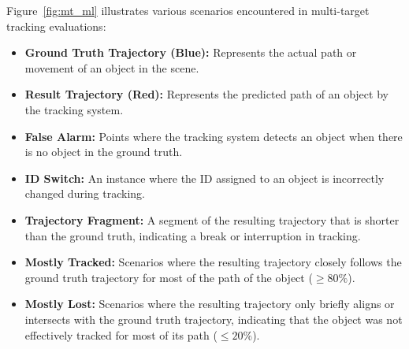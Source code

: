 Figure~\ref{fig:mt_ml} illustrates various scenarios encountered in multi-target tracking evaluations:

\begin{itemize}
    \item \textbf{Ground Truth Trajectory (Blue):} Represents the actual path or movement of an object in the scene.
    \item \textbf{Result Trajectory (Red):} Represents the predicted path of an object by the tracking system.
    \item \textbf{False Alarm:} Points where the tracking system detects an object when there is no object in the ground truth.
    \item \textbf{ID Switch:} An instance where the ID assigned to an object is incorrectly changed during tracking.
    \item \textbf{Trajectory Fragment:} A segment of the resulting trajectory that is shorter than the ground truth, indicating a break or interruption in tracking.
    \item \textbf{Mostly Tracked:} Scenarios where the resulting trajectory closely follows the ground truth trajectory for most of the path of the object (\(\geq 80\%\)).
    \item \textbf{Mostly Lost:} Scenarios where the resulting trajectory only briefly aligns or intersects with the ground truth trajectory, indicating that the object was not effectively tracked for most of its path (\(\leq 20\%\)).
\end{itemize}